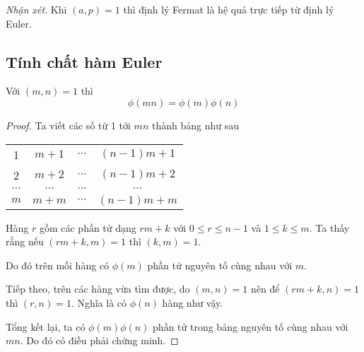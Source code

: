 \textit{Nhận xét}. Khi $(a, p) = 1$ thì định lý Fermat là hệ quả trực tiếp từ định lý Euler.

\subsection{Tính chất hàm Euler}

\begin{remark}
    Với $(m, n) = 1$ thì \[ \phi(m n) = \phi(m) \phi(n) \]
\end{remark}

\begin{proof}
    Ta viết các số từ 1 tới $mn$ thành bảng như sau

    \begin{center}
        \begin{tabular}{c c c c}
            1 & $m+1$ & $\cdots$ & $(n-1)m + 1$ \\
            2 & $m+2$ & $\cdots$ & $(n-1)m + 2$ \\
            $\cdots$ & $\cdots$ & $\cdots$ & $\cdots$ \\
            $m$ & $m+m$ & $\cdots$ & $(n-1)m + m$
        \end{tabular}
    \end{center}
    
    Hàng $r$ gồm các phần tử dạng $r m + k$ với $0 \leq r \leq n-1$ và $1 \leq k \leq m$. 
    Ta thấy rằng nếu $(rm + k, m) = 1$ thì $(k, m) = 1$.

    Do đó trên mỗi hàng có $\phi(m)$ phần tử nguyên tố cùng nhau với $m$.

    Tiếp theo, trên các hàng vừa tìm được, do $(m, n) = 1$ nên để $(rm + k, n) = 1$ thì $(r, n) = 1$.
    Nghĩa là có $\phi(n)$ hàng như vậy.

    Tổng kết lại, ta có $\phi(m) \phi(n)$ phần tử trong bảng nguyên tố cùng nhau với $mn$. Do đó có điều phải chứng minh.
\end{proof}

\newpage